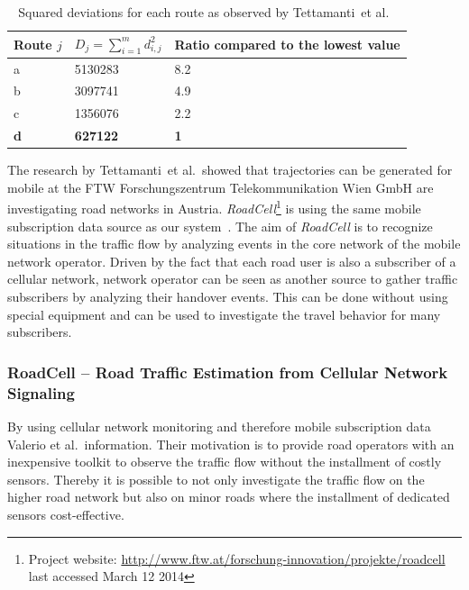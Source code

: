 \begin{table}[ht]

\begin{tabular}{l|ll}
\hline
Route $j$                   &  $D_j=\sum_{i=1}^{m} d_{i,j}^{2}$ & Ratio compared to
the lowest value  \\ \hline
a&5130283&8.2 \\
b&3097741&4.9 \\
c&1356076&2.2 \\
\textbf{d}  &\textbf{627122} &\textbf{1} \\ \hline
\end{tabular}
\caption{Squared deviations for each route as observed by Tettamanti~et al.\ \cite{Tettamanti2012}}
\label{tab:tetta}
\end{table}

The research by Tettamanti~et al.\ showed that trajectories can be generated for mobile \cite{Valerio2009,Valerio20092} at the FTW Forschungszentrum Telekommunikation Wien GmbH are investigating road networks in Austria. \emph{RoadCell}\footnote{Project website: \url{http://www.ftw.at/forschung-innovation/projekte/roadcell} last accessed March 12 2014} is using the same mobile subscription data source as our system~\cite{RoadCell2009}. The aim of \emph{RoadCell} is to recognize situations in the traffic flow by analyzing events in the core network of the mobile network operator. Driven by the fact that each road user is also a subscriber of a cellular network, network operator can be seen as another source to gather traffic subscribers by analyzing their handover events. This can be done without using special equipment and can be used to investigate the travel behavior for many subscribers.

\subsubsection{RoadCell -- Road Traffic Estimation from Cellular Network Signaling}
By using cellular network monitoring and therefore mobile subscription data Valerio et al.\ information. Their motivation is to provide road operators with an inexpensive toolkit to observe the traffic flow without the installment of costly sensors. Thereby it is possible to not only investigate the traffic flow on the higher road network but also on minor roads where the installment of dedicated sensors cost-effective.

